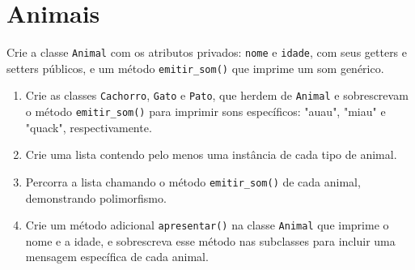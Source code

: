 \documentclass{article}
\begin{document}
\section{Animais}
Crie a classe \texttt{Animal} com os atributos privados: \texttt{nome} e \texttt{idade}, com seus getters e setters públicos, e um método \texttt{emitir\_som()} que imprime um som genérico.

\begin{enumerate}
    \item Crie as classes \texttt{Cachorro}, \texttt{Gato} e \texttt{Pato}, que herdem de \texttt{Animal} e sobrescrevam o método \texttt{emitir\_som()} para imprimir sons específicos: "auau", "miau" e "quack", respectivamente.
    \item Crie uma lista contendo pelo menos uma instância de cada tipo de animal.
    \item Percorra a lista chamando o método \texttt{emitir\_som()} de cada animal, demonstrando polimorfismo.
    \item Crie um método adicional \texttt{apresentar()} na classe \texttt{Animal} que imprime o nome e a idade, e sobrescreva esse método nas subclasses para incluir uma mensagem específica de cada animal.
\end{enumerate}
\end{document}
